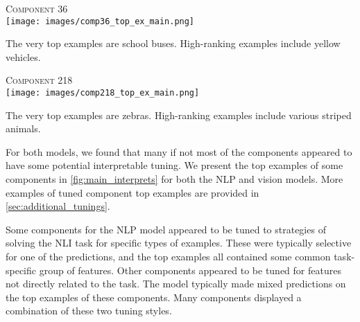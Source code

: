 \documentclass[dvipsnames]{article}
\begin{document}
\begin{figure*}[ht]
\begin{minipage}{.39\textwidth}
\textsc{Component 36}\\

\texttt{[image: images/comp36\_top\_ex\_main.png]} \vspace{-2mm} \\
\begin{flushleft}
\begin{small}
The very top examples are school buses.
High-ranking examples include yellow vehicles.
\end{small}
\end{flushleft}

\textsc{Component 218}\\

\texttt{[image: images/comp218\_top\_ex\_main.png]} \vspace{-2mm} \\
\begin{flushleft}
\begin{small}
The very top examples are zebras.
High-ranking examples include various striped animals.
\end{small}
\end{flushleft}

\end{minipage}
\caption{%
Top examples for some NLP and vision components.
The examples presented for the NLP components are the ones with the top 4 highest coefficients.
The top two rows for each vision component are the examples with the 8 highest coefficients.
The bottom row for each vision component contains selected examples from the set of top 32 examples.
}
\label{fig:main_interprets}
\vskip -0.2in
\end{figure*}

For both models, we found that many if not most of the components appeared to have some potential interpretable tuning.
We present the top examples of some components in \cref{fig:main_interprets} for both the NLP and vision models.
More examples of tuned component top examples are provided in \cref{sec:additional_tunings}.

Some components for the NLP model appeared to be tuned to strategies of solving the NLI task for specific types of examples.
These were typically selective for one of the predictions, and the top examples all contained some common task-specific group of features.
Other components appeared to be tuned for features not directly related to the task.
The model typically made mixed predictions on the top examples of these components.
Many components displayed a combination of these two tuning styles.
\end{document}
